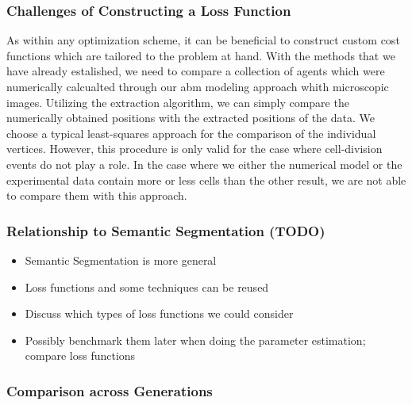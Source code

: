 \documentclass{article}
\begin{document}
\subsubsection{Challenges of Constructing a Loss Function}

As within any optimization scheme, it can be beneficial to construct custom cost functions
which are tailored to the problem at hand.
With the methods that we have already estalished, we need to compare a collection of agents which
were numerically calcualted through our \ac{abm} modeling approach whith microscopic images.
Utilizing the extraction algorithm, we can simply compare the numerically obtained positions with
the extracted positions of the data.
We choose a typical least-squares approach for the comparison of the individual vertices.
However, this procedure is only valid for the case where cell-division events do not play a role.
In the case where we either the numerical model or the experimental data contain more or less cells
than the other result, we are not able to compare them with this approach.

\subsubsection{Relationship to Semantic Segmentation (TODO)}
\cite{Jadon2020}

\begin{itemize}
    \item Semantic Segmentation is more general
    \item Loss functions and some techniques can be reused
    \item Discuss which types of loss functions we could consider
    \item Possibly benchmark them later when doing the parameter estimation; compare loss functions
\end{itemize}

\subsubsection{Comparison across Generations}
\label{subsec:comparison-across-generations}
\end{document}
